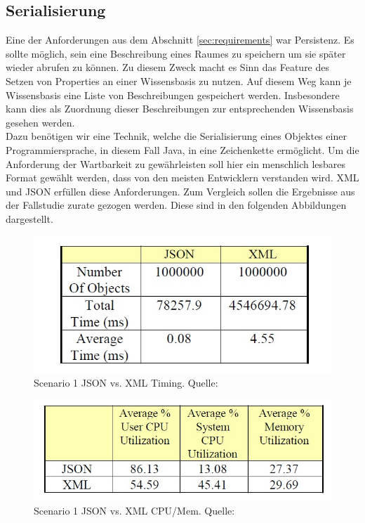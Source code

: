 \documentclass[a4paper]{article}
\begin{document}
	\subsection{Serialisierung}
	\label{sec:konz_serialisierung}
	
	Eine der Anforderungen aus dem Abschnitt \ref{sec:requirements} war Persistenz.
	Es sollte möglich, sein eine Beschreibung eines Raumes zu speichern um sie später
	wieder abrufen zu können. Zu diesem Zweck macht es Sinn das Feature des Setzen
	von Properties an einer Wissensbasis zu nutzen. Auf diesem Weg kann je 
	Wissensbasis eine Liste von Beschreibungen gespeichert werden. Insbesondere
	kann dies als Zuordnung dieser Beschreibungen zur entsprechenden Wissensbasis
	gesehen werden. \\
	
	Dazu benötigen wir eine Technik, welche die Serialisierung eines Objektes einer
	Programmiersprache, in diesem Fall Java, in eine Zeichenkette ermöglicht. Um
	die Anforderung der Wartbarkeit zu gewährleisten soll hier ein menschlich
	lesbares Format gewählt werden, dass von den meisten Entwicklern verstanden
	wird. XML und JSON erfüllen diese Anforderungen. Zum Vergleich sollen die
	Ergebnisse aus der Fallstudie \cite{XmlJson} zurate gezogen werden.
	Diese sind in den folgenden Abbildungen dargestellt.
	
	\begin{figure}[H] 
		\centerline{
			\includegraphics[scale=0.78]{../Bilder/xml_json_time_sen1.jpg}
		}
		\caption{Scenario 1 JSON vs. XML Timing. Quelle: \cite{XmlJson}}
		\label{fig:xml_json_time_sen1}
	\end{figure}
	
	\begin{figure}[H] 
		\centerline{
			\includegraphics[scale=0.78]{../Bilder/xml_json_mem_sen1.jpg}
		}
		\caption{Scenario 1 JSON vs. XML CPU/Mem. Quelle: \cite{XmlJson}}
		\label{fig:xml_json_mem_sen1}
	\end{figure}
	
\end{document}
